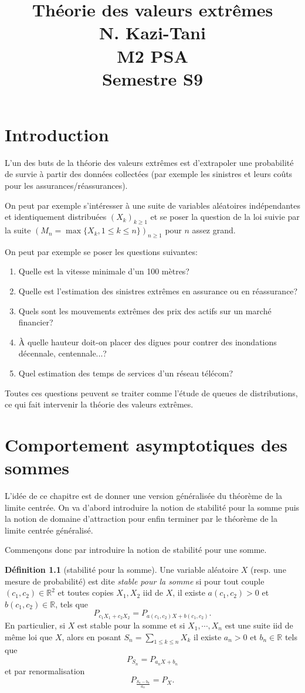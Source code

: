 \documentclass[10p,a4paper,reqno,titlepage]{report}
\title{Théorie des valeurs extrêmes \\N. Kazi-Tani \\
M2 PSA\\
Semestre S9}
\date{}
\newcommand{\R}{\mathbb{R}}
\theoremstyle{plain}
\theoremstyle{definition}
\newtheorem{de}[de]{Définition}
\begin{document}
\maketitle
\tableofcontents
\newpage

\chapter*{Introduction}
L'un des buts de la théorie des valeurs extrêmes est d'extrapoler une probabilité de survie à partir des données collectées (par exemple les sinistres et leurs coûts pour les assurances/réassurances).

On peut par exemple s'intéresser à une suite de variables aléatoires indépendantes et identiquement distribuées $(X_k)_{k\geq 1}$ et se poser la question de la loi suivie par la suite $(M_n = \max\{X_k, 1 \leq k \leq n\})_{n\geq 1}$ pour $n$ assez grand.

On peut par exemple se poser les questions suivantes:\
\begin{enumerate}
	\item Quelle est la vitesse minimale d'un 100 mètres?
	\item Quelle est l'estimation des sinistres extrêmes en assurance ou en réassurance?
	\item Quels sont les mouvements extrêmes des prix des actifs sur un marché financier?
	\item \`A quelle hauteur doit-on placer des digues pour contrer des inondations décennale, centennale...?
	\item Quel estimation des temps de services d'un réseau télécom?
\end{enumerate}
Toutes ces questions peuvent se traiter comme l'étude de queues de distributions, ce qui fait intervenir la théorie des valeurs extrêmes.

\chapter{Comportement asymptotiques des sommes}
L'idée de ce chapitre est de donner une version généralisée du théorème de la limite centrée. On va d'abord introduire la notion de stabilité pour la somme puis la notion de domaine d'attraction pour enfin terminer par le théorème de la limite centrée généralisé.

Commençons donc par introduire la notion de stabilité pour une somme.
\begin{de}[stabilité pour la somme]
	Une variable aléatoire $X$ (resp. une mesure de probabilité) est dite \textit{stable pour la somme} si pour tout couple $(c_1,c_2)\in\R^2$ et toutes copies $X_1,X_2$ iid de $X$, il existe $a(c_1,c_2)>0$ et $b(c_1,c_2) \in \R$, tels que 
	$$ P_{c_1 X_1 + c_2 X_2} = P_{a(c_1,c_2)X+ b(c_1,c_2)}.$$
	En particulier, si $X$ est stable pour la somme et si $X_1,\cdots,X_n$ est une suite iid de même loi que $X$, alors en posant $S_n = \sum_{1\leq k \leq n} X_k$ il existe $a_n >0$ et $b_n \in\R$ tels que
	$$ P_{S_n}= P_{a_n X +b_n}$$
	et par renormalisation
	$$ P_{\frac{S_n -b_n}{a_n}}=P_X.$$
\end{de}
\end{document}
